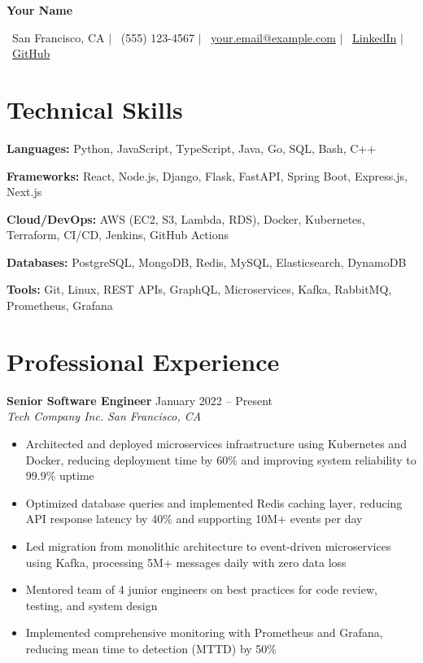\documentclass[11pt,letterpaper]{article}
\newcommand{\name}[1]{
  \begin{center}
    {\huge\bfseries #1}
  \end{center}
  \vspace{-8pt}
}
\newcommand{\contact}[5]{
  \begin{center}
    \faMapMarker*\ #1 $|$ \faPhone*\ #2 $|$ \faEnvelope\ \href{mailto:#3}{#3} $|$ \faLinkedin\ \href{#4}{LinkedIn} $|$ \faGithub\ \href{#5}{GitHub}
  \end{center}
  \vspace{-5pt}
}
\newcommand{\jobheader}[4]{
  \textbf{#1} \hfill #2 \\
  \textit{#3} \hfill \textit{#4}
  \vspace{-5pt}
}
\begin{document}
\name{Your Name}
\contact{San Francisco, CA}{(555) 123-4567}{your.email@example.com}{https://linkedin.com/in/yourprofile}{https://github.com/yourusername}

\section*{Technical Skills}

\textbf{Languages:} Python, JavaScript, TypeScript, Java, Go, SQL, Bash, C++

\textbf{Frameworks:} React, Node.js, Django, Flask, FastAPI, Spring Boot, Express.js, Next.js

\textbf{Cloud/DevOps:} AWS (EC2, S3, Lambda, RDS), Docker, Kubernetes, Terraform, CI/CD, Jenkins, GitHub Actions

\textbf{Databases:} PostgreSQL, MongoDB, Redis, MySQL, Elasticsearch, DynamoDB

\textbf{Tools:} Git, Linux, REST APIs, GraphQL, Microservices, Kafka, RabbitMQ, Prometheus, Grafana

\section*{Professional Experience}

\jobheader{Senior Software Engineer}{January 2022 -- Present}{Tech Company Inc.}{San Francisco, CA}
\begin{itemize}
  \item Architected and deployed microservices infrastructure using Kubernetes and Docker, reducing deployment time by 60\% and improving system reliability to 99.9\% uptime
  \item Optimized database queries and implemented Redis caching layer, reducing API response latency by 40\% and supporting 10M+ events per day
  \item Led migration from monolithic architecture to event-driven microservices using Kafka, processing 5M+ messages daily with zero data loss
  \item Mentored team of 4 junior engineers on best practices for code review, testing, and system design
  \item Implemented comprehensive monitoring with Prometheus and Grafana, reducing mean time to detection (MTTD) by 50\%
\end{itemize}
\end{document}
